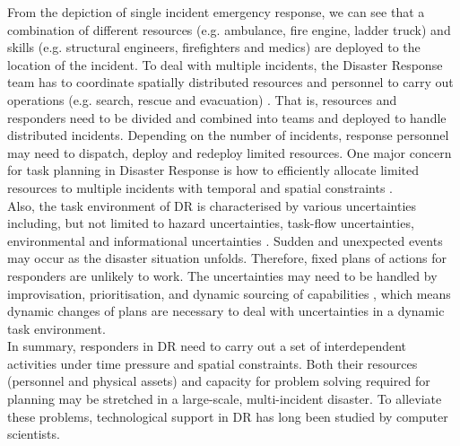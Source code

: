 From the depiction of single incident emergency response, we can see that a combination of different resources (e.g. ambulance, fire engine, ladder truck) and skills (e.g. structural engineers, firefighters and medics) are deployed to the location of the incident. To deal with multiple incidents, the Disaster Response team has to coordinate spatially distributed resources and personnel to carry out operations (e.g. search, rescue and evacuation) \citep{Chen2005}. That is, resources and responders need to be divided and combined into teams and deployed to handle distributed incidents. Depending on the number of incidents, response personnel may need to dispatch, deploy and redeploy limited resources. One major concern for task planning in Disaster Response is how to efficiently allocate limited resources to multiple incidents with temporal and spatial constraints \citep{Bradshaw2011}.\\

Also, the task environment of \ac{DR} is characterised by various uncertainties including, but not limited to hazard uncertainties, task-flow uncertainties, environmental and informational uncertainties \citep{Chen2008}. Sudden and unexpected events may occur as the disaster situation unfolds. Therefore, fixed plans of actions for responders are unlikely to work. The uncertainties may need to be handled by improvisation, prioritisation, and dynamic sourcing of capabilities \citep{Faraj2006}, which means dynamic changes of plans are necessary to deal with uncertainties in a dynamic task environment.\\   

In summary, responders in \ac{DR} need to carry out a set of interdependent activities under time pressure and spatial constraints. Both their resources (personnel and physical assets) and capacity for problem solving required for planning may be stretched in a large-scale, multi-incident disaster. To alleviate these problems, technological support in \ac{DR} has long been studied by computer scientists.\\ 





